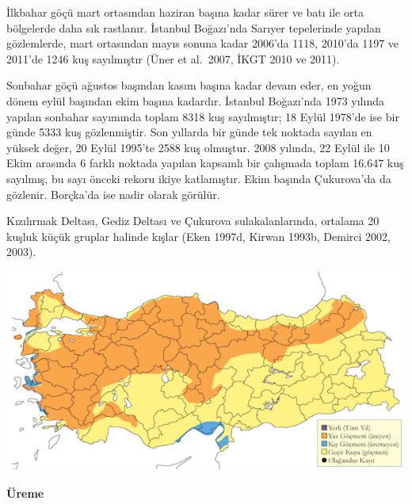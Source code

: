 \documentclass[
  letterpaper,
  DIV=11,
  numbers=noendperiod]{scrreprt}
\begin{document}
İlkbahar göçü mart ortasından haziran başına kadar sürer ve batı ile
orta bölgelerde daha sık rastlanır. İstanbul Boğazı'nda Sarıyer
tepelerinde yapılan gözlemlerde, mart ortasından mayıs sonuna kadar
2006'da 1118, 2010'da 1197 ve 2011'de 1246 kuş sayılmıştır (Üner et
al.~2007, İKGT 2010 ve 2011).

Sonbahar göçü ağustos başından kasım başına kadar devam eder, en yoğun
dönem eylül başından ekim başına kadardır. İstanbul Boğazı'nda 1973
yılında yapılan sonbahar sayımında toplam 8318 kuş sayılmıştır; 18 Eylül
1978'de ise bir günde 5333 kuş gözlenmiştir. Son yıllarda bir günde tek
noktada sayılan en yüksek değer, 20 Eylül 1995'te 2588 kuş olmuştur.
2008 yılında, 22 Eylül ile 10 Ekim arasında 6 farklı noktada yapılan
kapsamlı bir çalışmada toplam 16.647 kuş sayılmış, bu sayı önceki rekoru
ikiye katlamıştır. Ekim başında Çukurova'da da gözlenir. Borçka'da ise
nadir olarak görülür.

Kızılırmak Deltası, Gediz Deltası ve Çukurova sulakalanlarında, ortalama
20 kuşluk küçük gruplar halinde kışlar (Eken 1997d, Kirwan 1993b,
Demirci 2002, 2003).

\includegraphics{images/harita_Page_059.png}

\textbf{Üreme}
\end{document}
